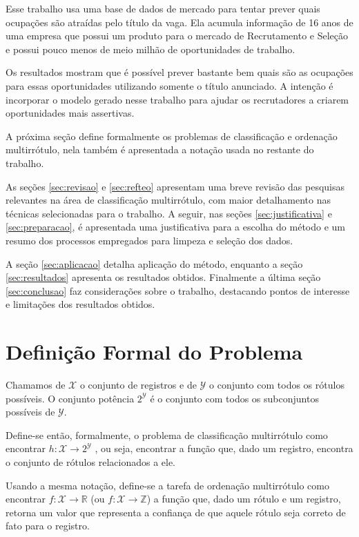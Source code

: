 \documentclass[runningheads,a4paper]{llncs}
\begin{document}
Esse trabalho usa uma base de dados de mercado para tentar prever quais ocupações são atraídas pelo título da vaga. Ela acumula informação de 16 anos de uma empresa que possui um produto para o mercado de Recrutamento e Seleção e possui pouco menos de meio milhão de oportunidades de trabalho.

Os resultados mostram que é possível prever bastante bem quais são as ocupações para essas oportunidades utilizando somente o título anunciado. A intenção é incorporar o modelo gerado nesse trabalho para ajudar os recrutadores a criarem oportunidades mais assertivas.

A próxima seção define formalmente os problemas de classificação e ordenação multirrótulo, nela também é apresentada a notação usada no restante do trabalho.

As seções \ref{sec:revisao} e \ref{sec:refteo} apresentam uma breve revisão das pesquisas relevantes na área de classificação multirrótulo, com maior detalhamento nas técnicas selecionadas para o trabalho. A seguir, nas seções \ref{sec:justificativa} e \ref{sec:preparacao}, é apresentada uma justificativa para a escolha do método e  um resumo dos processos empregados para limpeza e seleção dos dados.

A seção \ref{sec:aplicacao} detalha aplicação do método, enquanto a seção \ref{sec:resultados} apresenta os resultados obtidos. Finalmente a última seção \ref{sec:conclusao} faz considerações sobre o trabalho, destacando pontos de interesse e limitações dos resultados obtidos.

\section{Definição Formal do Problema} \label{sec:formal}

Chamamos de $\mathcal{X}$ o conjunto de registros e de $\mathcal{Y}$ o conjunto com todos os rótulos possíveis. O conjunto potência $2^{\mathcal{Y}}$ é o conjunto com todos os subconjuntos possíveis de $\mathcal{Y}$.

Define-se então, formalmente, o problema de classificação multirrótulo como encontrar $h : \mathcal{X} \to 2^\mathcal{Y}$ , ou seja, encontrar a função que, dado um registro, encontra o conjunto de rótulos relacionados a ele.

Usando a mesma notação, define-se a tarefa de ordenação multirrótulo como encontrar $f : \mathcal{X} \to \mathbb{R}$ (ou $f : \mathcal{X} \to \mathbb{Z}$) a função que, dado um rótulo e um registro, retorna um valor que representa a confiança de que aquele rótulo seja correto de fato para o registro.
\end{document}
